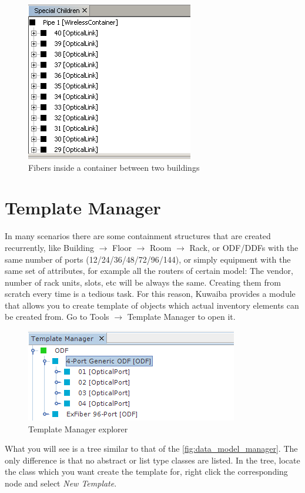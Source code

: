 \documentclass[a4paper]{article}
\begin{document}
		\begin{figure}[h!]
			\centering
			\includegraphics[width=0.3\linewidth]{img/navigation_tree_special_children_explorer.png}
			\caption{Fibers inside a container between two buildings}
			\label{fig:navigation_tree_special_children_explorer}
		\end{figure}
			
	\newpage
	\section{Template Manager} \label{sec:template_manager}
	In many scenarios there are some containment structures that are created recurrently, like Building $\rightarrow$ Floor $\rightarrow$ Room $\rightarrow$ Rack, or ODF/DDFs with the same number of ports (12/24/36/48/72/96/144), or simply equipment with the same set of attributes, for example all the routers of certain model: The vendor, number of rack units, slots, etc will be always the same. Creating them from scratch every time is a tedious task. For this reason, Kuwaiba provides a module that allows you to create template of objects which actual inventory elements can be created from. Go to Tools $\rightarrow$ Template Manager to open it.
	
	\begin{figure}[h!]
		\centering
		\includegraphics[width=0.7\linewidth]{img/template_manager_intro.png}
		\caption{Template Manager explorer}
		\label{fig:template_manager_intro}
	\end{figure}

	What you will see is a tree similar to that of the \ref{fig:data_model_manager}. The only difference is that no abstract or list type classes are listed. In the tree, locate the class which you want create the template for, right click the corresponding node and select \textit{New Template}.
	
\end{document}
